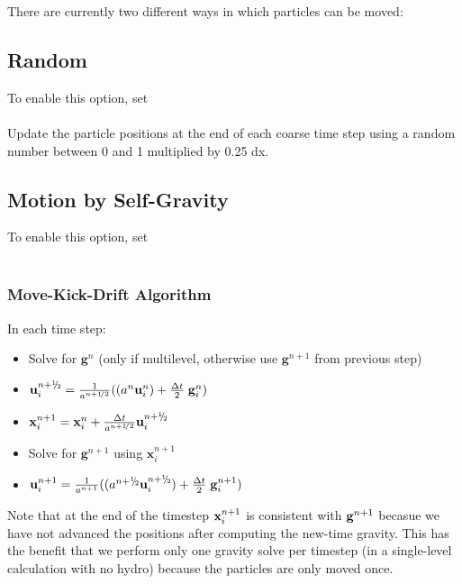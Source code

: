 \noindent There are currently two different ways in which particles can be moved:

\subsection{Random}

\noindent To enable this option, set \\

 \\

\noindent Update the particle positions at the end of each coarse time step using a 
random number between 0 and 1 multiplied by 0.25 dx.

\subsection{Motion by Self-Gravity}

\noindent To enable this option, set \\

 \\

\subsubsection{Move-Kick-Drift Algorithm}

In each time step:
\begin{itemize}
\item Solve for ${\mathbf g}^n$  (only if multilevel, otherwise use ${\mathbf g}^{n+1}$ from previous step)
\item ${\mathbf u}_i^{\nph} = \frac{1}{a^{\nph}} ( (a^n {\mathbf u}^n_i) + \frac{\dt}{2} \; {\mathbf g}^n_i )$
\item ${\mathbf x}_i^{n+1 } = {\mathbf x}^n_i +  \frac{\dt}{a^{\nph}}  {\mathbf u}_i^{\nph}$
\item Solve for ${\mathbf g}^{n+1}$ using ${\mathbf x}_i^{n+1}$
\item ${\mathbf u}_i^{n+1} = \frac{1}{a^{n+1}} ( (a^{\nph} {\mathbf u}^{\nph}_i) + \frac{\dt}{2} \; {\mathbf g}^{n+1}_i )$
\end{itemize}

Note that at the end of the timestep ${\bf x}_i^{n+1}$ is consistent with ${\bf g}^{n+1}$ becasue
we have not advanced the positions after computing the new-time gravity.  This has the benefit that
we perform only one gravity solve per timestep (in a single-level calculation with no hydro) because
the particles are only moved once.

